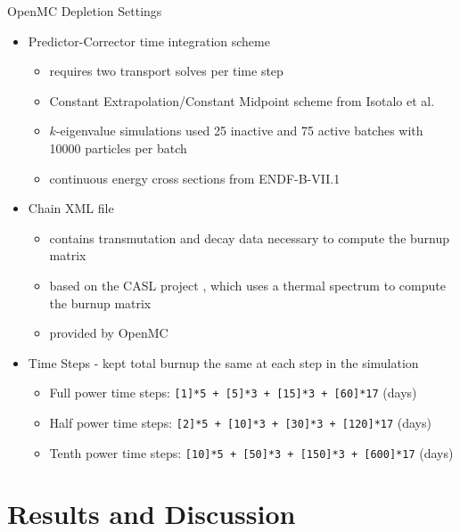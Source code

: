 \documentclass[9pt,t,aspectratio=169]{beamer}
\begin{document}
\begin{frame}{OpenMC Depletion Settings}
    \pause
    \begin{itemize}
        \item<2-> Predictor-Corrector time integration scheme
        \begin{itemize}
            \item<3-> requires two transport solves per time step
            \item<4-> Constant Extrapolation/Constant Midpoint scheme from Isotalo et al. \cite{isotalo_comparison_2015}
            \item<5-> $k$-eigenvalue simulations used 25 inactive and 75 active batches with 10000 particles per batch
            \item<6-> continuous energy cross sections from ENDF-B-VII.1
        \end{itemize}
        \item<7-> Chain XML file
        \begin{itemize}
            \item<8-> contains transmutation and decay data necessary to compute the burnup matrix
            \item<9-> based on the CASL project \cite{CASL-report}, which uses a thermal spectrum to compute the burnup matrix
            \item<10-> provided by OpenMC \cite{openmc-chains}
        \end{itemize}
        \item<11-> Time Steps - kept total burnup the same at each step in the simulation
        \begin{itemize}
            \item<12-> Full power time steps: \texttt{[1]*5 + [5]*3 + [15]*3 + [60]*17} (days)
            \item<13-> Half power time steps: \texttt{[2]*5 + [10]*3 + [30]*3 + [120]*17} (days)
            \item<14-> Tenth power time steps: \texttt{[10]*5 + [50]*3 + [150]*3 + [600]*17} (days)
        \end{itemize}
    \end{itemize}
\end{frame}
\section{Results and Discussion}
\end{document}
